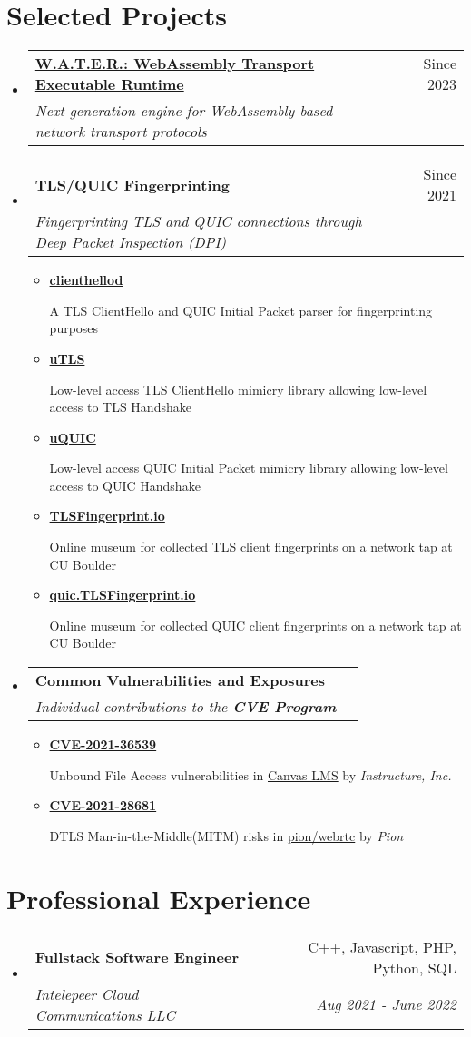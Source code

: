 \documentclass[letterpaper,11pt]{article}
\makeatletter
\newcommand{\resumeItem}[1]{
  \item\small{
    {#1 \vspace{-2pt}}
  }
}
\newcommand{\resumeSubheading}[4]{
  \vspace{-2pt}\item
    \begin{tabular*}{0.97\textwidth}[t]{l@{\extracolsep{\fill}}r}
      \textbf{#1} & #2 \\
      \textit{\small#3} & \textit{\small #4} \\
    \end{tabular*}\vspace{-7pt}
}
\newcommand{\resumeSubHeadingListStart}{\begin{itemize}[leftmargin=0.15in, label={}]}
\newcommand{\resumeSubHeadingListEnd}{\end{itemize}}
\newcommand{\resumeItemListStart}{\begin{itemize}}
\newcommand{\resumeItemListEnd}{\end{itemize}\vspace{-5pt}}
\makeatother
\begin{document}
\section{Selected Projects}
\resumeSubHeadingListStart
\resumeSubheading
{\href{https://github.com/gaukas/water}{\textbf{W.A.T.E.R.: WebAssembly Transport Executable Runtime}}}{Since 2023}
{Next-generation engine for WebAssembly-based network transport protocols}{}
\resumeSubheading
{\textbf{TLS/QUIC Fingerprinting}}{Since 2021}
{Fingerprinting TLS and QUIC connections through Deep Packet Inspection (DPI)}{}
\resumeItemListStart
  \resumeItem{\href{https://github.com/gaukas/clienthellod}{\textbf{clienthellod}}}
    {A TLS ClientHello and QUIC Initial Packet parser for fingerprinting purposes}
  \resumeItem{\href{https://github.com/refraction-networking/utls}{\textbf{uTLS}}}
    {Low-level access TLS ClientHello mimicry library allowing low-level access to TLS Handshake}
  \resumeItem{\href{https://github.com/refraction-networking/uquic}{\textbf{uQUIC}}}
    {Low-level access QUIC Initial Packet mimicry library allowing low-level access to QUIC Handshake}
  \resumeItem{\href{https://tlsfingerprint.io}{\textbf{TLSFingerprint.io}}}
    {Online museum for collected TLS client fingerprints on a network tap at CU Boulder}
  \resumeItem{\href{https://quic.tlsfingerprint.io}{\textbf{quic.TLSFingerprint.io}}}
    {Online museum for collected QUIC client fingerprints on a network tap at CU Boulder}  
\resumeItemListEnd
\resumeSubheading
{\textbf{Common Vulnerabilities and Exposures}}{}
{Individual contributions to the \textbf{CVE\textsuperscript{\textregistered} Program}}{}
\resumeItemListStart
  \resumeItem{\href{https://www.cve.org/CVERecord?id=CVE-2021-36539}{\textbf{CVE-2021-36539}}}
    {Unbound File Access vulnerabilities in \href{https://www.instructure.com/canvas}{Canvas LMS} by \emph{Instructure, Inc.}}
  \resumeItem{\href{https://www.cve.org/CVERecord?id=CVE-2021-28681}{\textbf{CVE-2021-28681}}}
    {DTLS Man-in-the-Middle(MITM) risks in \href{https://github.com/pion/webrtc}{pion/webrtc} by \emph{Pion}}
\resumeItemListEnd
\resumeSubHeadingListEnd
\vspace{1pt}

\section{Professional Experience}
\resumeSubHeadingListStart
\resumeSubheading
{Fullstack Software Engineer}{C++, Javascript, PHP, Python, SQL}
{Intelepeer Cloud Communications LLC}{Aug 2021 - June 2022}
\resumeSubHeadingListEnd
\vspace{1pt}
\end{document}
